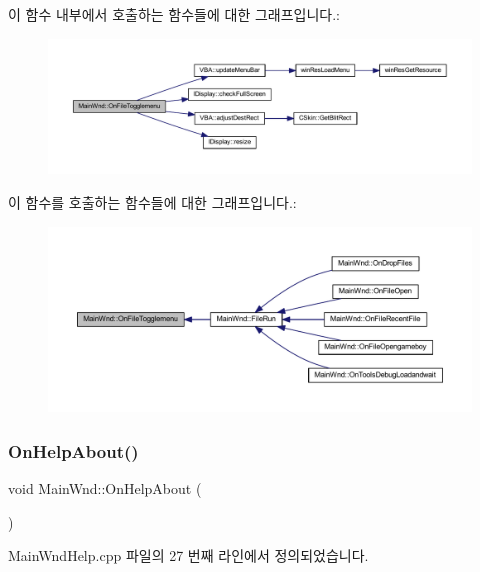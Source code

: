 이 함수 내부에서 호출하는 함수들에 대한 그래프입니다.\+:
\nopagebreak
\begin{figure}[H]
\begin{center}
\leavevmode
\includegraphics[width=350pt]{class_main_wnd_ad376d27bd5299961827dda9d8700a375_cgraph}
\end{center}
\end{figure}
이 함수를 호출하는 함수들에 대한 그래프입니다.\+:
\nopagebreak
\begin{figure}[H]
\begin{center}
\leavevmode
\includegraphics[width=350pt]{class_main_wnd_ad376d27bd5299961827dda9d8700a375_icgraph}
\end{center}
\end{figure}
\mbox{\label{class_main_wnd_a2151b9822f8f20900f98142b3f74d2be}} 
\subsubsection{\texorpdfstring{On\+Help\+About()}{OnHelpAbout()}}
{\footnotesize\ttfamily void Main\+Wnd\+::\+On\+Help\+About (\begin{DoxyParamCaption}{ }\end{DoxyParamCaption})\hspace{0.3cm}{\ttfamily [protected]}}



Main\+Wnd\+Help.\+cpp 파일의 27 번째 라인에서 정의되었습니다.


